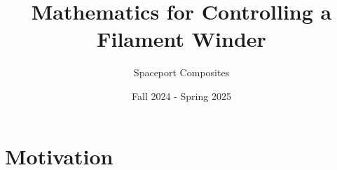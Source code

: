 \documentclass{article}
\title{Mathematics for Controlling a Filament Winder}
\author{Spaceport Composites}
\date{Fall 2024 - Spring 2025}
\begin{document}
\maketitle

\newpage

\section{Motivation}
\end{document}
